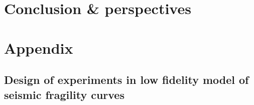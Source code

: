 \documentclass[a4paper]{book}
\renewcommand{\familydefault}{\sfdefault}
\begin{document}




\part{Conclusion \& perspectives}


\appendix
\part*{Appendix}


\chapter{Design of experiments in low fidelity model of seismic fragility curves}



 
 
\printbibliography 
{}

\newpage
\pagestyle{empty}
\ \cleardoublepage
\renewcommand{\familydefault}{\sfdefault}


 
\end{document}
